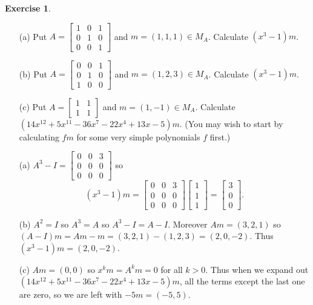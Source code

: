 \documentclass{amsart}
\newcommand{\bsm}       {\left[\begin{smallmatrix}}
\newcommand{\esm}       {\end{smallmatrix}\right]}
\newcommand{\ip}[1]     {\langle #1\rangle}
\renewcommand{\:}{\colon}
\theoremstyle{definition}
\newtheorem{exercise}{Exercise}[section]
\renewenvironment{solution}{\SolutionAtEnd}{\endSolutionAtEnd}
\begin{document}
\begin{exercise}
 \begin{itemize}
  \item[(a)] Put $A=\bsm 1&0&1\\0&1&0\\0&0&1\esm$ and
   $m=(1,1,1)\in M_A$.  Calculate $(x^3-1)m$.
  \item[(b)] Put $A=\bsm 0&0&1\\0&1&0\\1&0&0\esm$ and
   $m=(1,2,3)\in M_A$.  Calculate $(x^3-1)m$.
  \item[(c)] Put $A=\bsm 1&1\\1&1\esm$ and $m=(1,-1)\in M_A$.
   Calculate $(14x^{12}+5x^{11}-36x^7-22x^4+13x-5)m$.  (You may wish
   to start by calculating $fm$ for some very simple polynomials $f$
   first.)
 \end{itemize}
\end{exercise}
\begin{solution}
 \begin{itemize}
  \item[(a)] $A^3-I=\bsm 0&0&3\\0&0&0\\0&0&0\esm$ so
   \[ (x^3-1)m = \bsm 0&0&3\\0&0&0\\0&0&0\esm\bsm 1\\1\\1\esm
               = \bsm 3\\0\\0\esm.
   \]
  \item[(b)] $A^2=I$ so $A^3=A$ so $A^3-I=A-I$.  Moreover $Am=(3,2,1)$
   so $(A-I)m=Am-m=(3,2,1)-(1,2,3)=(2,0,-2)$.  Thus
   $(x^3-1)m=(2,0,-2)$.
  \item[(c)] $Am=(0,0)$ so $x^km=A^km=0$ for all $k>0$.  Thus when we
   expand out $(14x^{12}+5x^{11}-36x^7-22x^4+13x-5)m$, all the terms
   except the last one are zero, so we are left with $-5m=(-5,5)$.
 \end{itemize}
\end{solution}
\end{document}
